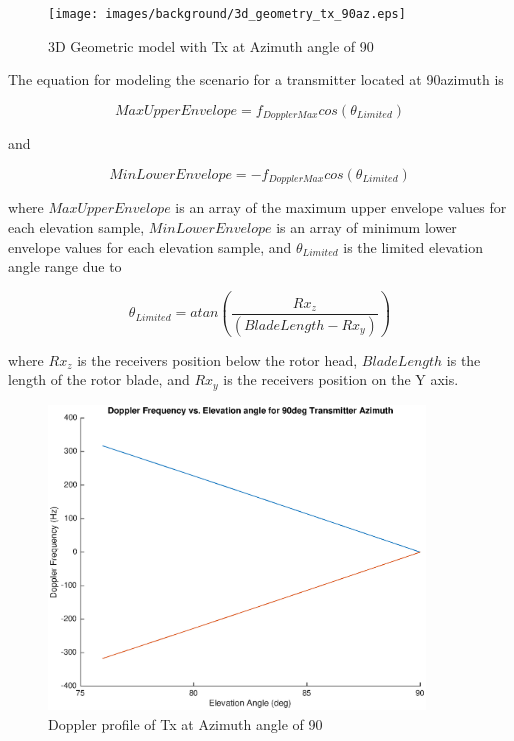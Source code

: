\begin{figure}
	\begin{center}
		\texttt{[image: images/background/3d\_geometry\_tx\_90az.eps]}
		\caption{3D Geometric model with Tx at Azimuth angle of 90\textdegree}
		\label{fig:3D_model_90az}
	\end{center}
\end{figure}

The equation for modeling the scenario for a transmitter located at 90\textdegree \space azimuth is

\begin{equation}
	MaxUpperEnvelope = f_{DopplerMax}cos(\theta_{Limited})
	\label{eq:theory_90_upper}
\end{equation}

and

\begin{equation}
	MinLowerEnvelope = -f_{DopplerMax}cos(\theta_{Limited})
	\label{eq:theory_90_lower}
\end{equation}

where $MaxUpperEnvelope$ is an array of the maximum upper envelope values for each elevation sample, $MinLowerEnvelope$ is an array of minimum lower envelope values for each elevation sample, and $\theta_{Limited}$ is the limited elevation angle range due to 

\begin{equation}
	\theta_{Limited} = atan\left(\frac{Rx_z}{(BladeLength - Rx_y)}\right)
	\label{eq:theory_90_limited}
\end{equation}

where $Rx_z$ is the receivers position below the rotor head, $BladeLength$ is the length of the rotor blade, and $Rx_y$ is the receivers position on the Y axis.

\begin{figure}
	\begin{center}
		\includegraphics[width=10cm]{images/background/3d_geometry_tx_90az_doppler_profile.eps}
		\caption{Doppler profile of Tx at Azimuth angle of 90\textdegree}
		\label{fig:3D_model_90az_doppler}
	\end{center}
\end{figure}

